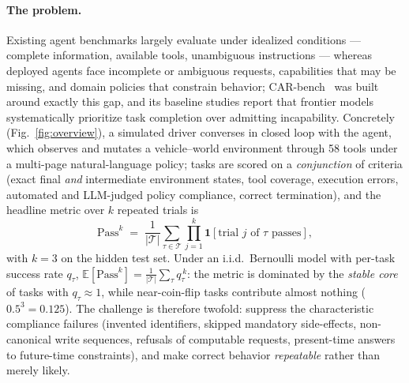 \documentclass{article}
\newcommand{\pass}[1]{\ensuremath{\mathrm{Pass}^{#1}}}
\begin{document}
\paragraph{The problem.}
Existing agent benchmarks largely evaluate under idealized conditions ---
complete information, available tools, unambiguous instructions --- whereas
deployed agents face incomplete or ambiguous requests, capabilities that may
be missing, and domain policies that constrain behavior;
CAR-bench~\cite{carbench} was built around exactly this gap, and its baseline
studies report that frontier models systematically prioritize task completion
over admitting incapability. Concretely (Fig.~\ref{fig:overview}), a
simulated driver converses in closed loop with the agent, which observes and
mutates a vehicle--world environment through 58 tools under a multi-page
natural-language policy; tasks are scored on a \emph{conjunction} of criteria
(exact final \emph{and} intermediate environment states, tool coverage,
execution errors, automated and LLM-judged policy compliance, correct
termination), and the headline metric over $k$ repeated trials is
\begin{equation}
\pass{k} \;=\; \frac{1}{|\mathcal{T}|}\sum_{\tau\in\mathcal{T}}
\prod_{j=1}^{k}\mathbf{1}\!\left[\text{trial } j \text{ of } \tau \text{ passes}\right],
\label{eq:passk}
\end{equation}
with $k{=}3$ on the hidden test set. Under an i.i.d.\ Bernoulli model with
per-task success rate $q_\tau$,
$\mathbb{E}[\pass{k}]=\frac{1}{|\mathcal{T}|}\sum_\tau q_\tau^{\,k}$: the
metric is dominated by the \emph{stable core} of tasks with
$q_\tau\!\approx\!1$, while near-coin-flip tasks contribute almost nothing
($0.5^3{=}0.125$). The challenge is therefore twofold: suppress the
characteristic compliance failures (invented identifiers, skipped mandatory
side-effects, non-canonical write sequences, refusals of computable requests,
present-time answers to future-time constraints), and make correct behavior
\emph{repeatable} rather than merely likely.
\end{document}
